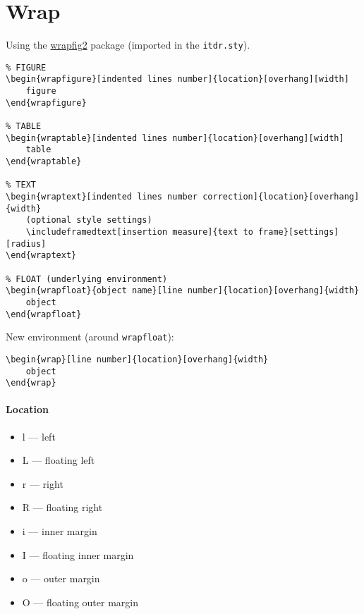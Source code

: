 \documentclass[itdr]{subfiles}
\begin{document}
\begin{minipage}{\textwidth}
\section{Wrap}

Using the \mbox{\href{https://www.ctan.org/pkg/wrapfig2}{wrapfig2}} package (imported in the \lstinline!itdr.sty!).

\begin{lstlisting}
% FIGURE
\begin{wrapfigure}[indented lines number]{location}[overhang][width]
	figure
\end{wrapfigure}

% TABLE
\begin{wraptable}[indented lines number]{location}[overhang][width]
	table
\end{wraptable}

% TEXT
\begin{wraptext}[indented lines number correction]{location}[overhang]{width}
	(optional style settings)
	\includeframedtext[insertion measure]{text to frame}[settings][radius]
\end{wraptext}

% FLOAT (underlying environment)
\begin{wrapfloat}{object name}[line number]{location}[overhang]{width}
	object
\end{wrapfloat}
\end{lstlisting}

New environment (around \lstinline!wrapfloat!):

\begin{lstlisting}
\begin{wrap}[line number]{location}[overhang]{width}
	object
\end{wrap}
\end{lstlisting}

\paragraph{Location}

\begin{itemize}
	\item l --- left
	\item L --- floating left
	\item r --- right
	\item R --- floating right
	\item i --- inner margin
	\item I --- floating inner margin
	\item o --- outer margin
	\item O --- floating outer margin
\end{itemize}


\end{minipage}
\end{document}
